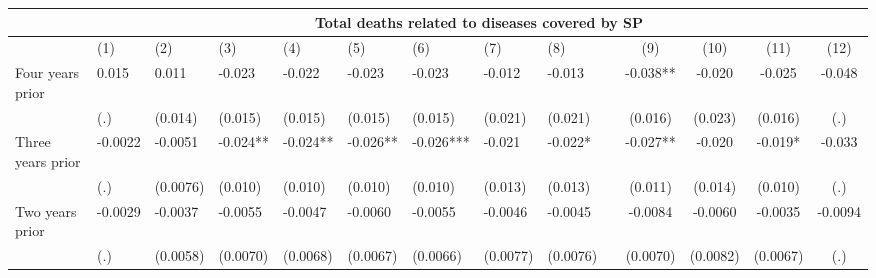 \begin{tabular}{lccccrrrrrcccc}
\toprule
      & \multicolumn{13}{c}{Total deaths related to diseases covered by SP} \\
\midrule
      & \multicolumn{1}{l}{(1)} & \multicolumn{1}{l}{(2)} & \multicolumn{1}{l}{(3)} & \multicolumn{1}{l}{(4)} & \multicolumn{1}{l}{(5)} & \multicolumn{1}{l}{(6)} & \multicolumn{1}{l}{(7)} & \multicolumn{1}{l}{(8)} &       & (9)   & (10)  & (11)  & (12) \\
\midrule
\midrule
Four years prior & \multicolumn{1}{l}{0.015} & \multicolumn{1}{l}{0.011} & \multicolumn{1}{l}{-0.023} & \multicolumn{1}{l}{-0.022} & \multicolumn{1}{l}{-0.023} & \multicolumn{1}{l}{-0.023} & \multicolumn{1}{l}{-0.012} & \multicolumn{1}{l}{-0.013} &       & -0.038** & -0.020 & -0.025 & -0.048 \\
      & \multicolumn{1}{l}{(.)} & \multicolumn{1}{l}{(0.014)} & \multicolumn{1}{l}{(0.015)} & \multicolumn{1}{l}{(0.015)} & \multicolumn{1}{l}{(0.015)} & \multicolumn{1}{l}{(0.015)} & \multicolumn{1}{l}{(0.021)} & \multicolumn{1}{l}{(0.021)} &       & (0.016) & (0.023) & (0.016) & (.) \\
Three years prior & \multicolumn{1}{l}{-0.0022} & \multicolumn{1}{l}{-0.0051} & \multicolumn{1}{l}{-0.024**} & \multicolumn{1}{l}{-0.024**} & \multicolumn{1}{l}{-0.026**} & \multicolumn{1}{l}{-0.026***} & \multicolumn{1}{l}{-0.021} & \multicolumn{1}{l}{-0.022*} &       & -0.027** & -0.020 & -0.019* & -0.033 \\
      & \multicolumn{1}{l}{(.)} & \multicolumn{1}{l}{(0.0076)} & \multicolumn{1}{l}{(0.010)} & \multicolumn{1}{l}{(0.010)} & \multicolumn{1}{l}{(0.010)} & \multicolumn{1}{l}{(0.010)} & \multicolumn{1}{l}{(0.013)} & \multicolumn{1}{l}{(0.013)} &       & (0.011) & (0.014) & (0.010) & (.) \\
Two years prior & \multicolumn{1}{l}{-0.0029} & \multicolumn{1}{l}{-0.0037} & \multicolumn{1}{l}{-0.0055} & \multicolumn{1}{l}{-0.0047} & \multicolumn{1}{l}{-0.0060} & \multicolumn{1}{l}{-0.0055} & \multicolumn{1}{l}{-0.0046} & \multicolumn{1}{l}{-0.0045} &       & -0.0084 & -0.0060 & -0.0035 & -0.0094 \\
      & \multicolumn{1}{l}{(.)} & \multicolumn{1}{l}{(0.0058)} & \multicolumn{1}{l}{(0.0070)} & \multicolumn{1}{l}{(0.0068)} & \multicolumn{1}{l}{(0.0067)} & \multicolumn{1}{l}{(0.0066)} & \multicolumn{1}{l}{(0.0077)} & \multicolumn{1}{l}{(0.0076)} &       & (0.0070) & (0.0082) & (0.0067) & (.) \\

\end{tabular}
